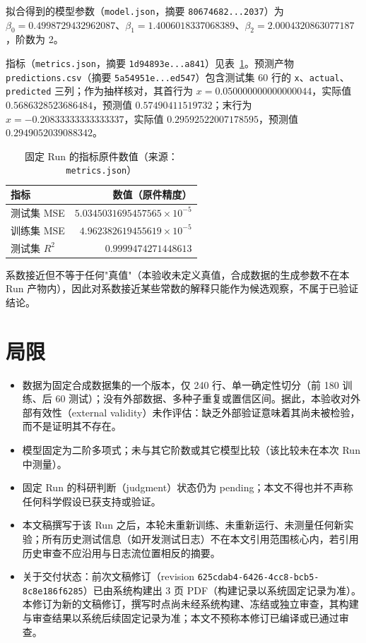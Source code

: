 \documentclass[a4paper,11pt]{article}
\begin{document}
拟合得到的模型参数（\texttt{model.json}，摘要 \texttt{80674682...2037}）为 $\beta_0=0.4998729432962087$、$\beta_1=1.4006018337068389$、$\beta_2=2.0004320863077187$，阶数为 2。

指标（\texttt{metrics.json}，摘要 \texttt{1d94893e...a841}）见表~\ref{tab:metrics}。预测产物 \texttt{predictions.csv}（摘要 \texttt{5a54951e...ed547}）包含测试集 60 行的 \texttt{x}、\texttt{actual}、\texttt{predicted} 三列；作为抽样核对，其首行为 $x=0.050000000000000044$，实际值 $0.5686328523686484$，预测值 $0.57490411519732$；末行为 $x=-0.20833333333333337$，实际值 $0.29592522007178595$，预测值 $0.2949052039088342$。

\begin{table}[htbp]
\centering
\caption{固定 Run 的指标原件数值（来源：\texttt{metrics.json}）}
\label{tab:metrics}
\begin{tabular}{lr}
\toprule
指标 & 数值（原件精度） \\
\midrule
测试集 MSE & $5.0345031695457565\times10^{-5}$ \\
训练集 MSE & $4.962382619455619\times10^{-5}$ \\
测试集 $R^2$ & $0.9999474271448613$ \\
\bottomrule
\end{tabular}
\end{table}

系数接近但不等于任何"真值"（本验收未定义真值，合成数据的生成参数不在本 Run 产物内），因此对系数接近某些常数的解释只能作为候选观察，不属于已验证结论。

\section{局限}

\begin{itemize}
\item 数据为固定合成数据集的一个版本，仅 240 行、单一确定性切分（前 180 训练、后 60 测试）；没有外部数据、多种子重复或置信区间。据此，本验收对外部有效性（external validity）未作评估：缺乏外部验证意味着其尚未被检验，而不是证明其不存在。
\item 模型固定为二阶多项式；未与其它阶数或其它模型比较（该比较未在本次 Run 中测量）。
\item 固定 Run 的科研判断（judgment）状态仍为 pending；本文不得也并不声称任何科学假设已获支持或验证。
\item 本文稿撰写于该 Run 之后，本轮未重新训练、未重新运行、未测量任何新实验；所有历史测试信息（如开发测试日志）不在本文引用范围核心内，若引用历史审查不应沿用与日志流位置相反的摘要。
\item 关于交付状态：前次文稿修订（revision \texttt{625cdab4-6426-4cc8-bcb5-}\allowbreak\texttt{8c8e186f6285}）已由系统构建出 3 页 PDF（构建记录以系统固定记录为准）。本修订为新的文稿修订，撰写时点尚未经系统构建、冻结或独立审查，其构建与审查结果以系统后续固定记录为准；本文不预称本修订已编译或已通过审查。
\end{itemize}
\end{document}

